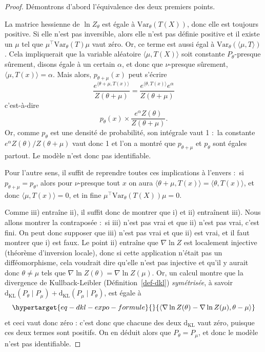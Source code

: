 \documentclass[
  10,
  letterpaper,
  DIV=11,
  numbers=noendperiod]{scrreport}
\newcommand{\dkl}{\mathrm{d}_{\mathrm{KL}}}
\theoremstyle{plain}
\theoremstyle{definition}
\theoremstyle{plain}
\theoremstyle{definition}
\theoremstyle{definition}
\theoremstyle{plain}
\theoremstyle{remark}
\begin{document}
\begin{proof}

Démontrons d'abord l'équivalence des deux premiers points.

La matrice hessienne de \(\ln Z_\theta\) est égale à
\(\mathrm{Var}_\theta(T(X))\), donc elle est toujours positive. Si elle
n'est pas inversible, alors elle n'est pas définie positive et il existe
un \(\mu\) tel que \(\mu^\top \mathrm{Var}_\theta(T) \mu\) vaut zéro.
Or, ce terme est aussi égal à
\(\mathrm{Var}_\theta(\langle \mu, T\rangle)\). Cela impliquerait que la
variable aléatoire \(\langle \mu, T(X)\rangle\) soit constante
\(P_\theta\)-presque sûrement, disons égale à un certain \(\alpha\), et
donc que \(\nu\)-presque sûrement,
\(\langle \mu, T(x)\rangle = \alpha\). Mais alors,
\(p_{\theta + \mu}(x)\) peut s'écrire
\[\frac{e^{\langle\theta + \mu, T(x)\rangle}}{Z(\theta + \mu)} = \frac{e^{\langle\theta, T(x)\rangle}e^{\alpha}}{Z(\theta + \mu)}\]
c'est-à-dire
\[p_\theta(x)\times \frac{e^\alpha Z(\theta)}{Z(\theta + \mu)}.\] Or,
comme \(p_\theta\) est une densité de probabilité, son intégrale vaut 1
:~la constante \(e^\alpha Z(\theta) / Z(\theta + \mu)\) vaut donc 1 et
l'on a montré que \(p_{\theta + \mu}\) et \(p_\theta\) sont égales
partout. Le modèle n'est donc pas identifiable.

Pour l'autre sens, il suffit de reprendre toutes ces implications à
l'envers :~si \(p_{\theta + \mu} = p_\theta\), alors pour
\(\nu\)-presque tout \(x\) on aura
\(\langle \theta + \mu, T(x)\rangle = \langle \theta, T(x)\rangle\), et
donc \(\langle \mu, T(x)\rangle = 0\), et in fine
\(\mu^\top \mathrm{Var}_\theta(T(X))\mu = 0\).

Comme iii) entraîne ii), il suffit donc de montrer que i) et ii)
entraînent iii). Nous allons montrer la contraposée :~si iii) n'est pas
vrai et que ii) n'est pas vrai, c'est fini. On peut donc supposer que
iii) n'est pas vrai et que ii) est vrai, et il faut montrer que i) est
faux. Le point ii) entraîne que \(\nabla \ln Z\) est localement
injective (théorème d'inversion locale), donc si cette application
n'était pas un difféomorphisme, cela voudrait dire qu'elle n'est pas
injective et qu'il y aurait donc \(\theta\neq\mu\) tels que
\(\nabla \ln Z(\theta) = \nabla \ln Z(\mu)\). Or, un calcul montre que
la divergence de Kullback-Leibler (Définition~\ref{def-dkl})
\emph{symétrisée}, à savoir
\(\dkl(P_\theta \mid P_\mu) + \dkl(P_\mu \mid P_\theta)\), est égale à
\begin{equation}\protect\hypertarget{eq-dkl-expo-formule}{}{\langle \nabla \ln Z(\theta) - \nabla \ln Z(\mu), \theta - \mu \rangle }\label{eq-dkl-expo-formule}\end{equation}
et ceci vaut donc zéro : c'est donc que chacune des deux \(\dkl\) vaut
zéro, puisque ces deux termes sont positifs. On en déduit alors que
\(P_\theta = P_\mu\), et donc le modèle n'est pas identifiable.

\end{proof}
\end{document}
